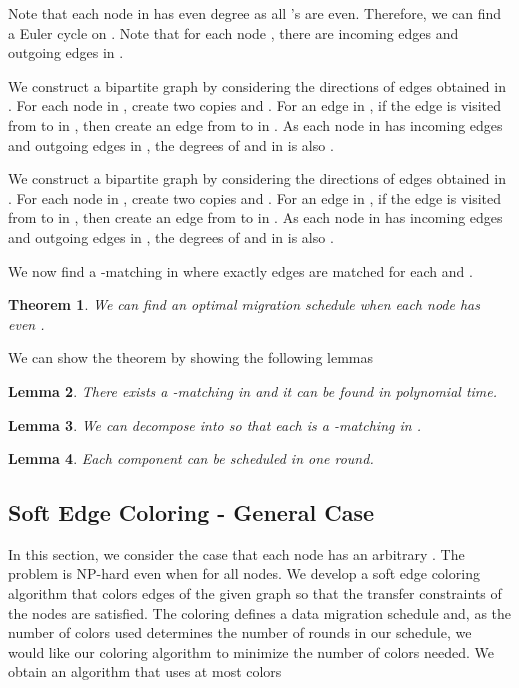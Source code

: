 \documentclass[titlepage, 11pt]{article}
\newtheorem{theorem}{Theorem}
\newtheorem{lemma}[theorem]{Lemma}
\begin{document}
Note that each node in  has even degree  as all 's are even. 
Therefore, we can find a Euler cycle  on .
Note that  for each node , there are  incoming edges
and  outgoing edges in  .

We construct a bipartite graph  by considering the directions of edges
obtained in . For each node  in , create two copies 
and . For an edge  in , if the edge is visited
from  to  in , then create an edge from  to  in .
As each node  in  has  incoming edges and
 outgoing edges in , the degrees of  and
  in  is also .

We construct a bipartite graph  by considering the directions of edges
obtained in . For each node  in , create two copies 
and . For an edge  in , if the edge is visited
from  to  in , then create an edge from  to  in .
As each node  in  has  incoming edges and
 outgoing edges in , the degrees of  and
  in  is also .

\vspace{0.1in}
We now find a -matching in   where exactly  edges are matched for each 
and . 

\begin{theorem}
We can find an optimal migration schedule when each node has even .
\end{theorem}

We can show the theorem by showing the following lemmas 

\begin{lemma}
There exists  a -matching in  and it can be found in polynomial time.
\end{lemma}

\begin{lemma}
We can decompose  into 
so that each  is a -matching in .
\end{lemma}

\begin{lemma}
Each component  can be scheduled in one round.
\end{lemma}

\subsection{Soft Edge Coloring - General Case}
In this section, we consider the case that each node  has an arbitrary .
The problem is \textsf{NP}-hard even when  for all nodes.
We develop a soft edge coloring algorithm that colors edges of the given graph so that  
the transfer constraints  of the nodes are satisfied. 
The coloring defines a data migration schedule and, 
as the number of colors used determines the number of rounds in our schedule, 
we would like our coloring algorithm to minimize the number of colors needed.
We obtain an algorithm that uses at most  colors
\end{document}
